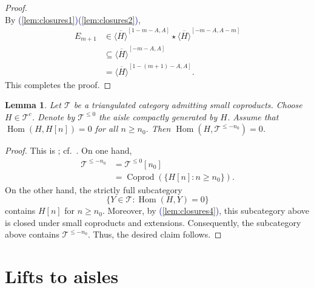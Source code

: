 \documentclass[11pt]{amsart}
\def\eqref#1{\textcolor{darkblue}{(\ref{#1})}}
\theoremstyle{plain}
\newtheorem{lemma}[theorem]{Lemma}
\theoremstyle{definition}
\numberwithin{equation}{section}
\numberwithin{theorem}{section}
\begin{document}
\begin{proof}
\begin{displaymath}
    \end{displaymath}
    By \eqref{lem:closures1}\eqref{lem:closures2},
    \begin{displaymath}
        \begin{aligned}
            E_{m+1} 
            & \in \overline{\langle H\rangle}^{[1-m-A,A]} \star \overline{\langle H\rangle}^{[-m-A,A-m]}
            \\& \subseteq \overline{\langle  H\rangle}^{[-m-A,A]} 
            \\&= \overline{\langle H\rangle}^{[1-(m+1)-A,A]}.
        \end{aligned}
    \end{displaymath}
    This completes the proof.
\end{proof}

\begin{lemma}
    \label{lem:hom_vanishing}
    Let $\mathcal{T}$ be a triangulated category admitting small coproducts. 
    Choose $H\in \mathcal{T}^c$.
    Denote by $\mathcal{T}^{\leq 0}$ the aisle compactly generated by $H$.
    Assume that $\operatorname{Hom}(H,H[n])=0$ for all $n\geq n_0$.
    Then $\operatorname{Hom}(H,\mathcal{T}^{\leq -n_0})=0$.
\end{lemma}

\begin{proof}
    This is \cite[Remark 1.24]{Neeman:2026}; cf.\ \cite[Lemma 3.5(1)]{Burke/Neeman/Pauwels:2023}.
    On one hand, 
    \begin{displaymath}
        \begin{aligned}
            \mathcal{T}^{\leq -n_0} 
            &= \mathcal{T}^{\leq 0}[n_0] 
            \\&= \operatorname{Coprod}(\{H[n] : n\geq n_0\}).
        \end{aligned}
    \end{displaymath}
    On the other hand, the strictly full subcategory 
    \begin{displaymath}
        \{Y \in \mathcal{T} : \operatorname{Hom}(H,Y)=0\}
    \end{displaymath}
    contains $H[n]$ for $n\geq n_0$. 
    Moreover, by \eqref{lem:closures4}, this subcategory above is closed under small coproducts and extensions.
    Consequently, the subcategory above contains $\mathcal{T}^{\leq -n_0}$.
    Thus, the desired claim follows.
\end{proof}

\section{Lifts to aisles}
\label{sec:lifts}
\end{document}
